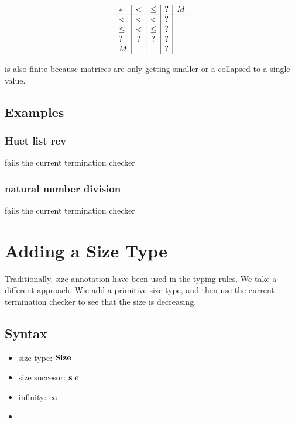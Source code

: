 \begin{definition}
\[
\begin{array}{l | c |c | c| c }
 *    &  <  &  \leq &   ? & M \\
\hline
  <   & <    & <    &   ? &   \\
 \leq & <    & \leq &   ? &   \\
 ?    & ?    & ?    &   ? &   \\
 M    &      &      &   ? &
\end{array}
\]
\end{definition}

\begin{definition}
is also finite because matrices are only getting smaller or a collapsed to a single value.
\end{definition}

\section{Examples}


\subsection{Huet list rev}
fails the current termination checker
\subsection{natural number division}
fails the current termination checker

\chapter{Adding a Size Type}
Traditionally, size annotation have been used in the typing rules.
We take a different approach.
Wie add a primitive size type, and then use the current termination checker to see that the size is 
decreasing.
\section{Syntax}

\begin{itemize}
\item
size type: $ \mathbf{Size} $ 
\item
size succesor: $\mathbf{s}\; e $ 
\item
infinity: $\infty$ 
\item
\end{itemize}

